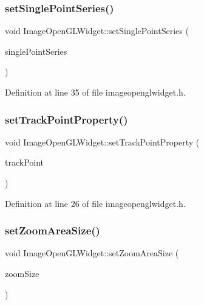 \subsubsection{\texorpdfstring{setSinglePointSeries()}{setSinglePointSeries()}}
{\footnotesize\ttfamily void Image\+Open\+G\+L\+Widget\+::set\+Single\+Point\+Series (\begin{DoxyParamCaption}\item[{bool}]{single\+Point\+Series }\end{DoxyParamCaption})\hspace{0.3cm}{\ttfamily [inline]}}



Definition at line 35 of file imageopenglwidget.\+h.

\mbox{\label{class_image_open_g_l_widget_a9f92b0518343d716a79e4f4958970b5f}} 
\subsubsection{\texorpdfstring{setTrackPointProperty()}{setTrackPointProperty()}}
{\footnotesize\ttfamily void Image\+Open\+G\+L\+Widget\+::set\+Track\+Point\+Property (\begin{DoxyParamCaption}\item[{\mbox{\hyperlink{struct_track_point_property}{Track\+Point\+Property}} $\ast$}]{track\+Point }\end{DoxyParamCaption})\hspace{0.3cm}{\ttfamily [inline]}}



Definition at line 26 of file imageopenglwidget.\+h.

\mbox{\label{class_image_open_g_l_widget_a874c34093bdf9ca318fe8283b610f1ee}} 
\subsubsection{\texorpdfstring{setZoomAreaSize()}{setZoomAreaSize()}}
{\footnotesize\ttfamily void Image\+Open\+G\+L\+Widget\+::set\+Zoom\+Area\+Size (\begin{DoxyParamCaption}\item[{double}]{zoom\+Size }\end{DoxyParamCaption})\hspace{0.3cm}{\ttfamily [inline]}}




